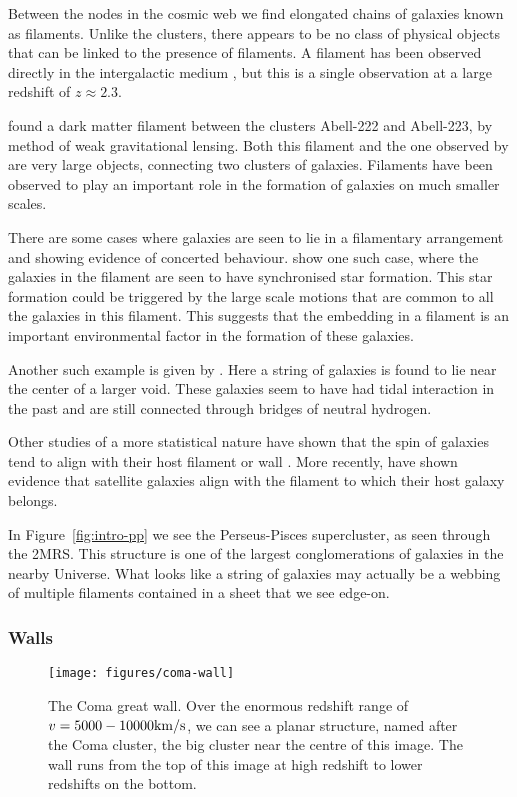 Between the nodes in the cosmic web we find elongated chains of galaxies known as filaments. Unlike the clusters, there appears to be no class of physical objects that can be linked to the presence of filaments. A filament has been observed directly in the intergalactic medium \citep{Cantalupo2014}, but this is a single observation at a large redshift of $z \approx 2.3$.

\citet{Dietrich2012} found a dark matter filament between the clusters Abell-222 and Abell-223, by method of weak gravitational lensing. Both this filament and the one observed by \citet{Cantalupo2014} are very large objects, connecting two clusters of galaxies. Filaments have been observed to play an important role in the formation of galaxies on much smaller scales.

There are some cases where galaxies are seen to lie in a filamentary arrangement and showing evidence of concerted behaviour. \citet{Zitrin2008} show one such case, where the galaxies in the filament are seen to have synchronised star formation. This star formation could be triggered by the large scale motions that are common to all the galaxies in this filament. This suggests that the embedding in a filament is an important environmental factor in the formation of these galaxies.

Another such example is given by \citet{Beygu2013}. Here a string of galaxies is found to lie near the center of a larger void. These galaxies seem to have had tidal interaction in the past and are still connected through bridges of neutral hydrogen.

Other studies of a more statistical nature have shown that the spin of galaxies tend to align with their host filament or wall \citep{AragonCalvo2007,Jones2010}. More recently, \citet{Tempel2015a} have shown evidence that satellite galaxies align with the filament to which their host galaxy belongs.

In Figure~\ref{fig:intro-pp} we see the Perseus-Pisces supercluster, as seen through the \ac{2MRS}. This structure is one of the largest conglomerations of galaxies in the nearby Universe. What looks like a string of galaxies may actually be a webbing of multiple filaments contained in a sheet that we see edge-on.


\subsubsection{Walls}
\begin{figure}
    \centering
    \texttt{[image: figures/coma-wall]}
    \caption{The Coma great wall. Over the enormous redshift range of $v = 5000-10000 {\rm km}/{\rm s}$, we can see a planar structure, named after the Coma cluster, the big cluster near the centre of this image. The wall runs from the top of this image at high redshift to lower redshifts on the bottom.}\label{fig:intro-coma}
\end{figure}

